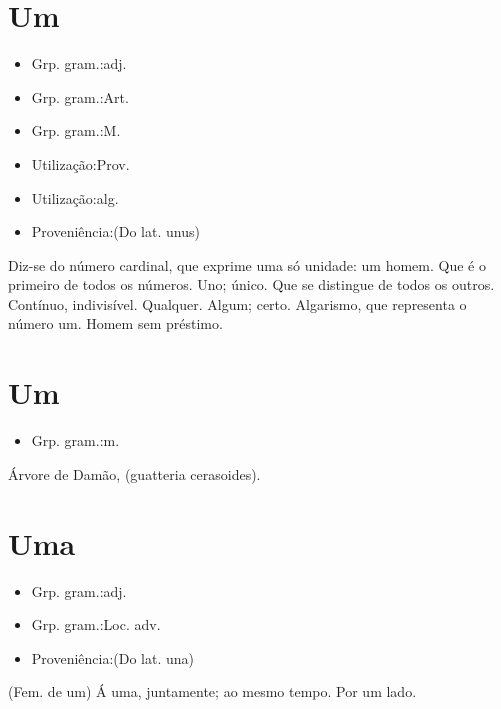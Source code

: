 \documentclass{article}
\begin{document}
\section{Um}
\begin{itemize}
\item {Grp. gram.:adj.}
\end{itemize}
\begin{itemize}
\item {Grp. gram.:Art.}
\end{itemize}
\begin{itemize}
\item {Grp. gram.:M.}
\end{itemize}
\begin{itemize}
\item {Utilização:Prov.}
\end{itemize}
\begin{itemize}
\item {Utilização:alg.}
\end{itemize}
\begin{itemize}
\item {Proveniência:(Do lat. \textunderscore unus\textunderscore )}
\end{itemize}
Diz-se do número cardinal, que exprime uma só unidade: \textunderscore um homem\textunderscore .
Que é o primeiro de todos os números.
Uno; único.
Que se distingue de todos os outros.
Contínuo, indivisível.
Qualquer.
Algum; certo.
Algarismo, que representa o número um.
Homem sem préstimo.
\section{Um}
\begin{itemize}
\item {Grp. gram.:m.}
\end{itemize}
Árvore de Damão, (\textunderscore guatteria cerasoides\textunderscore ).
\section{Uma}
\begin{itemize}
\item {Grp. gram.:adj.}
\end{itemize}
\begin{itemize}
\item {Grp. gram.:Loc. adv.}
\end{itemize}
\begin{itemize}
\item {Proveniência:(Do lat. \textunderscore una\textunderscore )}
\end{itemize}
(Fem. de \textunderscore um\textunderscore )
\textunderscore Á uma\textunderscore , juntamente; ao mesmo tempo.
Por um lado.
\end{document}
